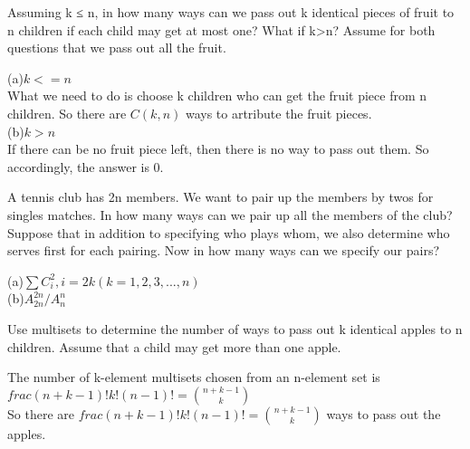 \documentclass[a4paper, justified]{tufte-handout}
\begin{document}
\begin{problem}[CS 1.2-6]
Assuming k ≤ n, in how many ways can we pass out k identical pieces of fruit to n children if each child may get at most one? What if k>n? Assume for both questions that we pass out all the fruit.
\end{problem}

\begin{solution}
  (a)$ k <= n$\\
  What we need to do is choose k children who can get the fruit piece from n children. So there are $C(k, n)$ ways to artribute the fruit pieces.\\
  (b)$k > n$\\
  If there can be no fruit piece left, then there is no way to pass out them. So accordingly, the answer is 0.\\
\end{solution}

\begin{problem}[CS 1.2-15]
A tennis club has 2n members. We want to pair up the members by twos for singles matches. In how many ways can we pair up all the members of the club? Suppose that in addition to specifying who plays whom, we also determine who serves first for each pairing. Now in how many ways can we specify our pairs?
\end{problem}

\begin{solution}
  (a)$\sum C_i^2, i = 2k(k = 1, 2, 3, ..., n)$\\
  (b)$A_{2n}^{2n} / A_n^n$
\end{solution}

\begin{problem}[CS 1.5-4]
Use multisets to determine the number of ways to pass out k identical apples to n children. Assume that a child may get more than one apple.
\end{problem}

\begin{solution}
  The number of k-element multisets chosen from an n-element set is$frac{(n + k - 1)!}{k!(n - 1)!} = \binom{n + k - 1}{k}$\\
  So there are $frac{(n + k - 1)!}{k!(n - 1)!} = \binom{n + k - 1}{k}$ ways to pass out the apples.
\end{solution}
\end{document}
